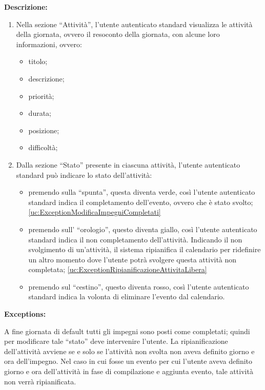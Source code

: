 \begin{listaPersonale}[UC]{}
    \textbf{Descrizione:}
    \begin{enumerate}
        \item Nella sezione “Attività”, l'utente autenticato standard visualizza le attività della giornata, ovvero il resoconto della giornata, con alcune loro informazioni, ovvero:
              \begin{itemize}
                  \item titolo;
                  \item descrizione;
                  \item priorità;
                  \item durata;
                  \item posizione;
                  \item difficoltà;
              \end{itemize}
        \item Dalla sezione “Stato” presente in ciascuna attività, l'utente autenticato standard può indicare lo stato dell'attività:
              \begin{itemize}
                  \item premendo sulla “spunta”, questa diventa verde, così l'utente autenticato standard indica il completamento dell'evento, ovvero che è stato svolto; \ref{uc:ExceptionModificaImpegniCompletati}
                  \item premendo sull' “orologio”, questo diventa giallo, così l'utente autenticato standard indica il non completamento dell'attività. Indicando il non svolgimento di un'attività, il sistema ripianifica il calendario per ridefinire un altro momento dove l'utente potrà svolgere questa attività non completata; \ref{uc:ExceptionRipianificazioneAttivitaLibera}
                  \item premendo sul “cestino”, questo diventa rosso, così l'utente autenticato standard indica la volonta di eliminare l'evento dal calendario.
              \end{itemize}

    \end{enumerate}



    \textbf{Exceptions:}
    \begin{enumerate}[label=\textbf{[exception \arabic{enumii}]}, ref= \textbf{[exception \arabic{enumii}]}]
         A fine giornata di default tutti gli impegni sono posti come completati; quindi per modificare tale “stato” deve intervenire l'utente.
         La ripianificazione dell'attività avviene se e solo se l'attività non svolta non aveva definito giorno e ora dell'impegno. Nel caso in cui fosse un evento per cui l'utente aveva definito giorno e ora dell'attività in fase di compilazione e aggiunta evento, tale attività non verrà ripianificata.
    \end{enumerate}


\end{listaPersonale}
